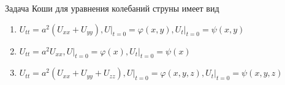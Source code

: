 Задача Коши для уравнения колебаний струны имеет вид

\begin{enumerate}[label=\arabic*)]
    \item \(U_{tt}=a^2\left(U_{xx}+U_{yy}\right) , U\vert _{t=0}=\varphi (x,y ), U_t\vert _{t=0}=\psi (x,y)\)
    \item \(U_{tt}=a^2U_{xx} , U\vert _{t=0}=\varphi (x ), U_t\vert _{t=0}=\psi (x)\)
    \item \(U_{tt}=a^2\left(U_{xx}+U_{yy}+U_{zz}\right) , U\vert _{t=0}=\varphi (x,y,z ), U_t\vert _{t=0}=\psi (x,y,z)\)
\end{enumerate}

